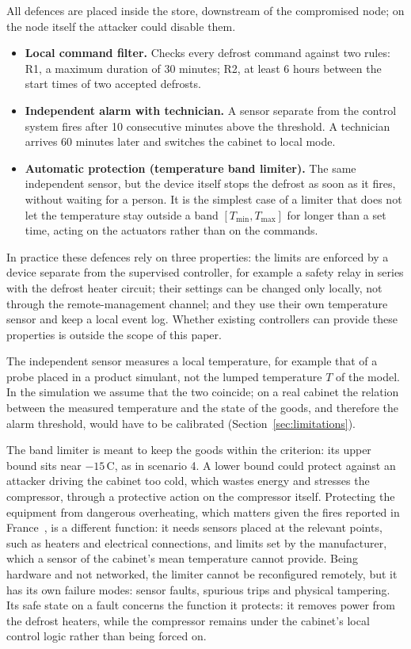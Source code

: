 \documentclass{ceurart}
\newcommand{\degC}{\,\textdegree{}C}
\begin{document}
All defences are placed inside the store, downstream of the compromised node; on the node itself the attacker could disable them.
\begin{itemize}
  \item \textbf{Local command filter.} Checks every defrost command against two rules: R1, a maximum duration of 30 minutes; R2, at least 6 hours between the start times of two accepted defrosts.
  \item \textbf{Independent alarm with technician.} A sensor separate from the control system fires after 10 consecutive minutes above the threshold. A technician arrives 60 minutes later and switches the cabinet to local mode.
  \item \textbf{Automatic protection (temperature band limiter).} The same independent sensor, but the device itself stops the defrost as soon as it fires, without waiting for a person. It is the simplest case of a limiter that does not let the temperature stay outside a band $[T_{\min}, T_{\max}]$ for longer than a set time, acting on the actuators rather than on the commands.
\end{itemize}
In practice these defences rely on three properties: the limits are enforced by a device separate from the supervised controller, for example a safety relay in series with the defrost heater circuit; their settings can be changed only locally, not through the remote-management channel; and they use their own temperature sensor and keep a local event log.
Whether existing controllers can provide these properties is outside the scope of this paper.

The independent sensor measures a local temperature, for example that of a probe placed in a product simulant, not the lumped temperature $T$ of the model.
In the simulation we assume that the two coincide; on a real cabinet the relation between the measured temperature and the state of the goods, and therefore the alarm threshold, would have to be calibrated (Section~\ref{sec:limitations}).

The band limiter is meant to keep the goods within the criterion: its upper bound sits near $-15$\degC, as in scenario 4.
A lower bound could protect against an attacker driving the cabinet too cold, which wastes energy and stresses the compressor, through a protective action on the compressor itself.
Protecting the equipment from dangerous overheating, which matters given the fires reported in France~\cite{anssi2026attribution}, is a different function: it needs sensors placed at the relevant points, such as heaters and electrical connections, and limits set by the manufacturer, which a sensor of the cabinet's mean temperature cannot provide.
Being hardware and not networked, the limiter cannot be reconfigured remotely, but it has its own failure modes: sensor faults, spurious trips and physical tampering.
Its safe state on a fault concerns the function it protects: it removes power from the defrost heaters, while the compressor remains under the cabinet's local control logic rather than being forced on.
\end{document}
